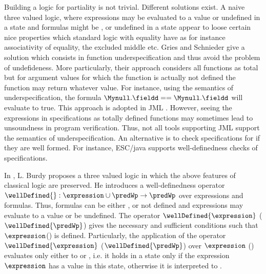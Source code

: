 Building a logic for partiality is not trivial. Different solutions exist. 
A naive three valued logic, where expressions may be evaluated to a value or  undefined  in a state and
 formulas might be \false{}, \true{} or undefined in a state appear to loose certain nice properties
 which standard logic with equality have
as for instance associativity of equality, the excluded middle \cite{gries95avoiding} etc. 
Gries and Schnieder \cite{gries95avoiding} give a solution which consists in function 
underspecification  and thus  avoid the problem of undefideness. 
 More particularly, their approach considers all functions as total but for argument values for which the function is actually 
not defined the function may return whatever value. 
For instance, using the semantics of underspecification, the formula $\Mynull.\fieldd== \Mynull.\fieldd$  will evaluate to true.
This approach is adopted in JML \cite{JMLRefMan}. However, seeing the expressions in specifications 
as totally defined functions may sometimes lead to unsoundness in program verification.
 Thus,  not all tools supporting JML support the semantics of underspecification. %
An alternative is to check specifications for if they are well formed.
 For instance, ESC/java supports well-definedness checks of specifications.


In \cite{burdy98treatment}, L. Burdy proposes a three valued logic in which the above features of classical logic are preserved.
He introduces a well-definedness operator $\wellDefined{}: \expression \cup \predWp \rightarrow \predWp$
 over expressions and formulas. Thus, formulas can be either \true{}, \false{} or not defined and
expressions may evaluate to a value or be undefined. The operator  $\wellDefined{\expression}$ ($\wellDefined{\predWp}$) 
 gives the necessary and sufficient
 conditions such that $\expression$(\predWp ) is defined. 
 Particularly, the application of the operator   $\wellDefined{\expression}$  ($\wellDefined{\predWp}$) over $\expression$  (\predWp ) 
 evaluates only either to \true{} or \false{}, i.e.  it holds in a state only if the expression $\expression$ has  a value in this state, otherwise it is interpreted to \false{}.   
  

